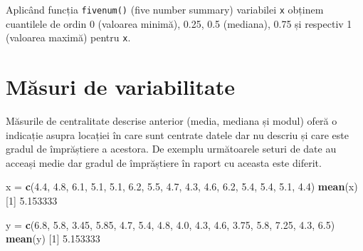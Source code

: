 \documentclass[]{article}
\newenvironment{Shaded}{\begin{snugshade}}{\end{snugshade}}
\newcommand{\KeywordTok}[1]{\textcolor[rgb]{0.13,0.29,0.53}{\textbf{#1}}}
\newcommand{\DecValTok}[1]{\textcolor[rgb]{0.00,0.00,0.81}{#1}}
\newcommand{\FloatTok}[1]{\textcolor[rgb]{0.00,0.00,0.81}{#1}}
\newcommand{\StringTok}[1]{\textcolor[rgb]{0.31,0.60,0.02}{#1}}
\newcommand{\OperatorTok}[1]{\textcolor[rgb]{0.81,0.36,0.00}{\textbf{#1}}}
\newcommand{\NormalTok}[1]{#1}
\begin{document}
Aplicând funcția \texttt{fivenum()} (five number summary) variabilei
\texttt{x} obținem cuantilele de ordin 0 (valoarea minimă), 0.25, 0.5
(mediana), 0.75 și respectiv 1 (valoarea maximă) pentru \texttt{x}.

\begin{Shaded}
\end{Shaded}

\section{Măsuri de variabilitate}\label{masuri-de-variabilitate}

Măsurile de centralitate descrise anterior (media, mediana și modul)
oferă o indicație asupra locației în care sunt centrate datele dar nu
descriu și care este gradul de împrăștiere a acestora. De exemplu
următoarele seturi de date au acceași medie dar gradul de împrăștiere în
raport cu aceasta este diferit.

\begin{Shaded}
\begin{Highlighting}[]
\NormalTok{x =}\StringTok{ }\KeywordTok{c}\NormalTok{(}\FloatTok{4.4}\NormalTok{, }\FloatTok{4.8}\NormalTok{, }\FloatTok{6.1}\NormalTok{, }\FloatTok{5.1}\NormalTok{, }\FloatTok{5.1}\NormalTok{, }\FloatTok{6.2}\NormalTok{, }\FloatTok{5.5}\NormalTok{, }\FloatTok{4.7}\NormalTok{, }\FloatTok{4.3}\NormalTok{, }
      \FloatTok{4.6}\NormalTok{, }\FloatTok{6.2}\NormalTok{, }\FloatTok{5.4}\NormalTok{, }\FloatTok{5.4}\NormalTok{, }\FloatTok{5.1}\NormalTok{, }\FloatTok{4.4}\NormalTok{)}
\KeywordTok{mean}\NormalTok{(x)}
\NormalTok{[}\DecValTok{1}\NormalTok{] }\FloatTok{5.153333}

\NormalTok{y =}\StringTok{ }\KeywordTok{c}\NormalTok{(}\FloatTok{6.8}\NormalTok{, }\FloatTok{5.8}\NormalTok{, }\FloatTok{3.45}\NormalTok{, }\FloatTok{5.85}\NormalTok{, }\FloatTok{4.7}\NormalTok{, }\FloatTok{5.4}\NormalTok{, }\FloatTok{4.8}\NormalTok{, }\FloatTok{4.0}\NormalTok{, }\FloatTok{4.3}\NormalTok{,}
      \FloatTok{4.6}\NormalTok{, }\FloatTok{3.75}\NormalTok{, }\FloatTok{5.8}\NormalTok{, }\FloatTok{7.25}\NormalTok{, }\FloatTok{4.3}\NormalTok{, }\FloatTok{6.5}\NormalTok{)}
\KeywordTok{mean}\NormalTok{(y)}
\NormalTok{[}\DecValTok{1}\NormalTok{] }\FloatTok{5.153333}
\end{Highlighting}
\end{Shaded}
\end{document}
